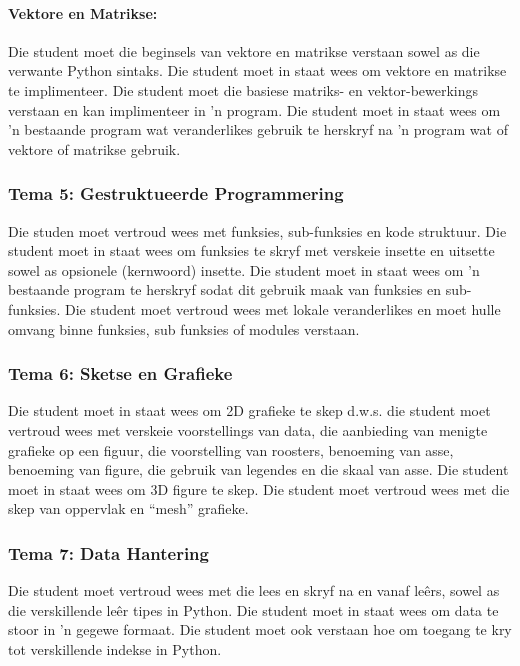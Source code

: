             \paragraph{Vektore en Matrikse:}
		 Die student moet die beginsels van vektore en matrikse verstaan 
		 sowel as die verwante Python sintaks.  Die student moet in staat wees
		 om vektore en matrikse te implimenteer.  Die student moet die 
		 basiese matriks- en vektor-bewerkings verstaan en kan implimenteer
		 in 'n program.  Die student moet in staat wees om 'n bestaande
		 program wat veranderlikes gebruik te herskryf na 'n program wat of vektore of 
		 matrikse gebruik.
		 
        \subsubsection{Tema 5: Gestruktueerde Programmering}
	     Die studen moet vertroud wees met funksies, sub-funksies en kode 
	     struktuur.  Die student moet in staat wees om funksies te skryf
	     met verskeie insette en uitsette sowel as opsionele (kernwoord) insette.
	     Die student moet in staat wees om 'n bestaande program te herskryf
	     sodat dit gebruik maak van funksies en sub-funksies.  Die student
	     moet vertroud wees met lokale veranderlikes en moet hulle omvang 
	     binne funksies, sub funksies of modules verstaan.
            
        \subsubsection{Tema 6: Sketse en Grafieke}
	     Die student moet in staat wees om 2D grafieke te skep d.w.s. die student
	     moet vertroud wees met verskeie voorstellings van data, die aanbieding
	     van menigte grafieke op een figuur, die voorstelling van roosters, 
	     benoeming van asse, benoeming van figure, die gebruik van legendes
	     en die skaal van asse.  Die student moet in staat wees om 3D figure
	     te skep.  Die student moet vertroud wees met die skep van 
	     oppervlak en ``mesh'' grafieke.

            
        \subsubsection{Tema 7: Data Hantering}
	     Die student moet vertroud wees met die lees en skryf na en vanaf
	     le\^{e}rs, sowel as die verskillende le\^{e}r tipes in Python.  Die 
	     student moet in staat wees om data te stoor in 'n gegewe formaat.
	     Die student moet ook verstaan hoe om toegang te kry tot verskillende 
	     indekse in Python.
	     

